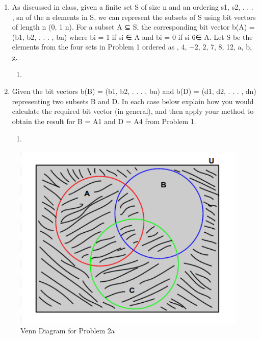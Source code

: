 \documentclass[a4paper,11pt]{article}
\begin{document}
\begin{enumerate}
\item As discussed in class, given a finite set S of size n and an ordering s1, s2, . . . , sn of the n
elements in S, we can represent the subsets of S using bit vectors of length n ({0, 1}
n). For a subset
A ⊆ S, the corresponding bit vector b(A) = (b1, b2, . . . , bn) where bi = 1 if si ∈ A and bi = 0 if si 6∈ A.
Let S be the elements from the four sets in Problem 1 ordered as , 4, −2, 2, 7, 8, 12, a, b, g.
  \begin{enumerate}
  \item
  \end{enumerate}



\item Given the bit vectors b(B) = (b1, b2, . . . , bn) and b(D) = (d1, d2, . . . , dn) representing two
subsets B and D. In each case below explain how you would calculate the required bit vector (in
general), and then apply your method to obtain the result for B = A1 and D = A4 from Problem 1.
  \begin{enumerate}
  \item
  \end{enumerate}

\end{enumerate}

  \begin{figure}
     \includegraphics[width=4.4in]{2Avenn}
   \caption{Venn Diagram for Problem 2a}
   \label{fig:tutorial}
  \end{figure} 
\end{document}
